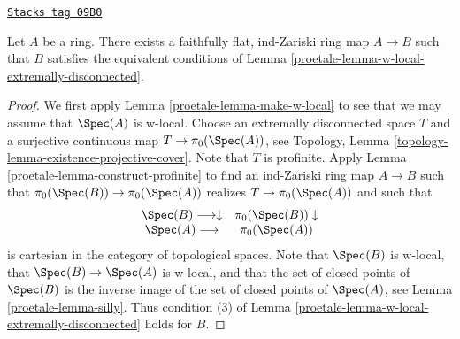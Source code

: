 \begin{lemma}
\label{proetale-lemma-find-Zariski-w-contractible}
\href{https://stacks.math.columbia.edu/tag/09B0}{\texttt{Stacks tag 09B0}}

Let $A$ be a ring. There exists a faithfully flat, ind-Zariski ring
map $A \to B$ such that $B$ satisfies the equivalent conditions
of Lemma \ref{proetale-lemma-w-local-extremally-disconnected}.
\end{lemma}

\begin{proof}

We first apply Lemma \ref{proetale-lemma-make-w-local} to see that we may assume that
$\Spec(A)$ is w-local.
Choose an extremally disconnected space $T$ and a surjective
continuous map $T \to \pi_0(\Spec(A))$, see
Topology, Lemma \ref{topology-lemma-existence-projective-cover}.
Note that $T$ is profinite. Apply Lemma \ref{proetale-lemma-construct-profinite}
to find an ind-Zariski ring map $A \to B$ such that
$\pi_0(\Spec(B)) \to \pi_0(\Spec(A))$ realizes $T \to \pi_0(\Spec(A))$
and such that
$$
\begin{array}{cc}\Spec(B) \longrightarrow\downarrow & \pi_0(\Spec(B)) \downarrow \\ \Spec(A) \longrightarrow & \pi_0(\Spec(A))\end{array}
$$
is cartesian in the category of topological spaces. Note that $\Spec(B)$
is w-local, that $\Spec(B) \to \Spec(A)$ is w-local, and that the
set of closed points of $\Spec(B)$ is the inverse image of the
set of closed points of $\Spec(A)$, see Lemma \ref{proetale-lemma-silly}.
Thus condition (3) of
Lemma \ref{proetale-lemma-w-local-extremally-disconnected}
holds for $B$.
\end{proof}

